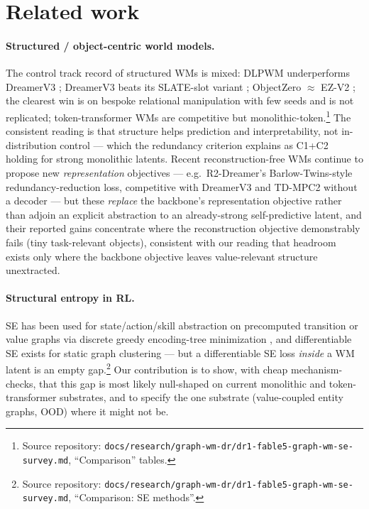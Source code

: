 \documentclass{article}
\begin{document}
\section{Related work}
\label{sec:related}

\paragraph{Structured / object-centric world models.} The control track record of structured WMs is mixed: DLPWM underperforms DreamerV3 \citep{ferraro2025dlpwm,hafner2025dreamerv3}; DreamerV3 beats its SLATE-slot variant \citep[ROCA;][]{ugadiarov2023roca}; ObjectZero $\approx$ EZ-V2 \citep{vakhitov2026objectzero}; the clearest win \citep[SOLD;][]{mosbach2024sold} is on bespoke relational manipulation with few seeds and is not replicated; token-transformer WMs \citep[IRIS, STORM;][]{micheli2023iris,zhang2023storm} are competitive but monolithic-token.\footnote{Source repository: \texttt{docs/research/graph-wm-dr/dr1-fable5-graph-wm-se-survey.md}, ``Comparison'' tables.} The consistent reading is that structure helps prediction and interpretability, not in-distribution control --- which the redundancy criterion explains as C1+C2 holding for strong monolithic latents. Recent reconstruction-free WMs continue to propose new \emph{representation} objectives --- e.g.\ R2-Dreamer's Barlow-Twins-style redundancy-reduction loss, competitive with DreamerV3 and TD-MPC2 without a decoder \citep{morihira2026r2dreamer} --- but these \emph{replace} the backbone's representation objective rather than adjoin an explicit abstraction to an already-strong self-predictive latent, and their reported gains concentrate where the reconstruction objective demonstrably fails (tiny task-relevant objects), consistent with our reading that headroom exists only where the backbone objective leaves value-relevant structure unextracted.

\paragraph{Structural entropy in RL.} SE \citep{li2016structural} has been used for state/action/skill abstraction on precomputed transition or value graphs via discrete greedy encoding-tree minimization \citep[SISA, SIDM, SIRD, SI2E;][]{zeng2023sisa,zeng2024sidm,zeng2024si2e}, and differentiable SE exists for static graph clustering \citep[LSEnet, DeSE;][]{sun2024lsenet} --- but a differentiable SE loss \emph{inside} a WM latent is an empty gap.\footnote{Source repository: \texttt{docs/research/graph-wm-dr/dr1-fable5-graph-wm-se-survey.md}, ``Comparison: SE methods''.} Our contribution is to show, with cheap mechanism-checks, that this gap is most likely null-shaped on current monolithic and token-transformer substrates, and to specify the one substrate (value-coupled entity graphs, OOD) where it might not be.
\end{document}
